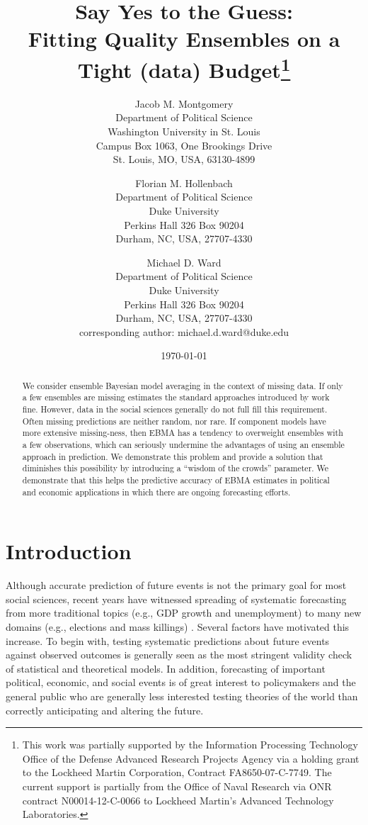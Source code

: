 \documentclass[12pt,fullpage,endnotes]{article}
\title{Say Yes to the Guess: \\ Fitting Quality Ensembles on a Tight
  (data) Budget\thanks{This work was partially supported by the Information Processing Technology Office of the Defense Advanced Research Projects Agency via a holding grant to the Lockheed Martin Corporation, Contract FA8650-07-C-7749. The current support is partially from the Office of Naval Research via ONR contract N00014-12-C-0066 to Lockheed Martin's Advanced Technology Laboratories.
    }}
\author{
Jacob M. Montgomery\\
	Department of Political Science\\
	Washington University in St. Louis\\
	Campus Box 1063, One Brookings Drive\\
	St. Louis, MO, USA, 63130-4899 
	\and
Florian M. Hollenbach  \\
	Department of Political Science\\
	Duke University\\
	Perkins Hall 326 Box 90204\\
	Durham, NC, USA, 27707-4330
	\and
Michael D. Ward\\
	Department of Political Science\\
	Duke University\\
	Perkins Hall 326 Box 90204\\
	Durham, NC, USA, 27707-4330\\
	corresponding author: michael.d.ward@duke.edu
}
\date{\today}
\begin{document}
\maketitle
\thispagestyle{empty}
\clearpage
\pagestyle{myheadings}
\newpage

\thispagestyle{empty}


\begin{abstract}
We consider ensemble Bayesian model averaging in the context of missing data.  If only
a few ensembles are missing  estimates the standard approaches introduced by \cite{Raftery:2005} work fine. However, data in the social sciences generally do not full fill this requirement. Often missing predictions are neither random, nor rare. If component models have more extensive missing-ness, then EBMA has a tendency to overweight ensembles with a few observations, which can seriously undermine the advantages of using an ensemble approach in prediction.  We demonstrate this problem and provide a solution that diminishes this possibility by introducing a ``wisdom of the crowds'' parameter. We demonstrate that this helps the predictive accuracy of EBMA estimates in political and economic applications in which there are ongoing forecasting efforts.
\end{abstract}

\doublespacing


\setcounter{page}{1}

\section{Introduction}
Although accurate prediction of future events is not the primary goal
for most social sciences, recent years have witnessed spreading of
systematic forecasting from more traditional topics (e.g., GDP growth
and unemployment) to many new domains (e.g., elections and mass
killings) .  Several factors have motivated this increase.  To begin
with, testing systematic predictions about future events against
observed outcomes is generally seen as the most stringent validity
check of statistical and theoretical models.  In addition, forecasting
of important political, economic, and social events is of great
interest to policymakers and the general public who are generally less
interested testing theories of the world than correctly anticipating
and altering the future.
\end{document}
